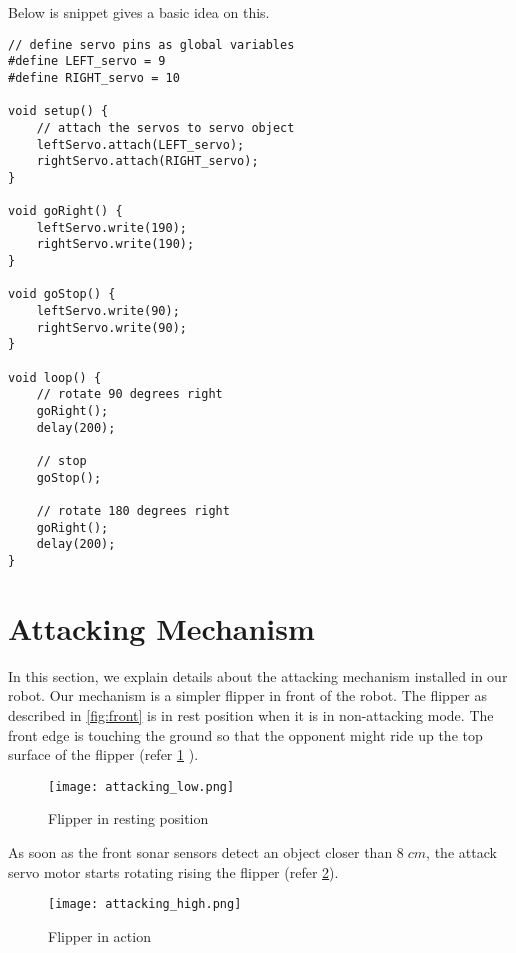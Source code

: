 \documentclass[11pt, letterpaper, oneside]{article}
\begin{document}
Below is snippet gives a basic idea on this.
\begin{verbatim}
// define servo pins as global variables
#define LEFT_servo = 9 
#define RIGHT_servo = 10

void setup() {
    // attach the servos to servo object
    leftServo.attach(LEFT_servo); 
    rightServo.attach(RIGHT_servo); 
}

void goRight() {
    leftServo.write(190);
    rightServo.write(190);
}

void goStop() {
    leftServo.write(90);
    rightServo.write(90);
}

void loop() {
    // rotate 90 degrees right
    goRight();
    delay(200);
    
    // stop
    goStop();
    
    // rotate 180 degrees right
    goRight();
    delay(200);
}
\end{verbatim}



\newpage
\section{Attacking Mechanism} \label{sec:attacking}
In this section, we explain details about the attacking mechanism installed in our robot. Our mechanism is a simpler flipper in front of the robot. The flipper as described in \cref{fig:front} is in rest position when it is in non-attacking mode. The front edge is touching the ground so that the opponent might ride up the top surface of the flipper (refer \cref{fig:attacking_low} ). 

\begin{figure}[bth]
	\begin{center}
		\texttt{[image: attacking\_low.png]}
		\caption{ Flipper in resting position}
		\label{fig:attacking_low}
	\end{center}
\end{figure}


As soon as the front sonar sensors detect an object closer than $8\;cm$, the attack servo motor starts rotating rising the flipper (refer \cref{fig:attacking_high}).

\begin{figure}[bth]
	\begin{center}
		\texttt{[image: attacking\_high.png]}
		\caption{ Flipper in action}
		\label{fig:attacking_high}
	\end{center}
\end{figure}
\end{document}
